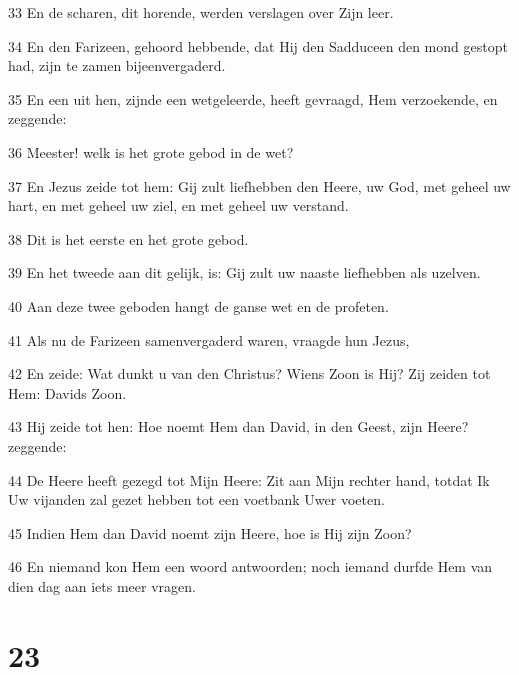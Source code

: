 \par 33 En de scharen, dit horende, werden verslagen over Zijn leer.
\par 34 En den Farizeen, gehoord hebbende, dat Hij den Sadduceen den mond gestopt had, zijn te zamen bijeenvergaderd.
\par 35 En een uit hen, zijnde een wetgeleerde, heeft gevraagd, Hem verzoekende, en zeggende:
\par 36 Meester! welk is het grote gebod in de wet?
\par 37 En Jezus zeide tot hem: Gij zult liefhebben den Heere, uw God, met geheel uw hart, en met geheel uw ziel, en met geheel uw verstand.
\par 38 Dit is het eerste en het grote gebod.
\par 39 En het tweede aan dit gelijk, is: Gij zult uw naaste liefhebben als uzelven.
\par 40 Aan deze twee geboden hangt de ganse wet en de profeten.
\par 41 Als nu de Farizeen samenvergaderd waren, vraagde hun Jezus,
\par 42 En zeide: Wat dunkt u van den Christus? Wiens Zoon is Hij? Zij zeiden tot Hem: Davids Zoon.
\par 43 Hij zeide tot hen: Hoe noemt Hem dan David, in den Geest, zijn Heere? zeggende:
\par 44 De Heere heeft gezegd tot Mijn Heere: Zit aan Mijn rechter hand, totdat Ik Uw vijanden zal gezet hebben tot een voetbank Uwer voeten.
\par 45 Indien Hem dan David noemt zijn Heere, hoe is Hij zijn Zoon?
\par 46 En niemand kon Hem een woord antwoorden; noch iemand durfde Hem van dien dag aan iets meer vragen.

\chapter{23}

